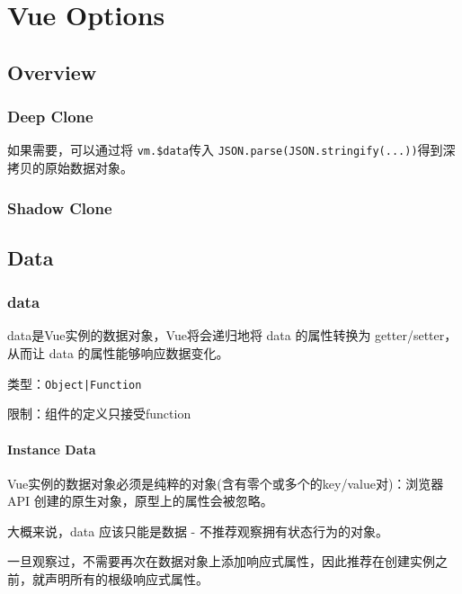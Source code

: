 \part{Vue Options}


\chapter{Overview}


\section{Deep Clone}



如果需要，可以通过将 \texttt{vm.\$data}传入 \texttt{JSON.parse(JSON.stringify(...))}得到深拷贝的原始数据对象。


\section{Shadow Clone}




\chapter{Data}

\section{data}


data是Vue实例的数据对象，Vue将会递归地将 data 的属性转换为 getter/setter，从而让 data 的属性能够响应数据变化。



\begin{compactitem}
\item 类型：\texttt{Object|Function}
\item 限制：组件的定义只接受function
\end{compactitem}

\subsection{Instance Data}


Vue实例的数据对象必须是纯粹的对象(含有零个或多个的key/value对)：浏览器 API 创建的原生对象，原型上的属性会被忽略。

大概来说，data 应该只能是数据 - 不推荐观察拥有状态行为的对象。


一旦观察过，不需要再次在数据对象上添加响应式属性，因此推荐在创建实例之前，就声明所有的根级响应式属性。



